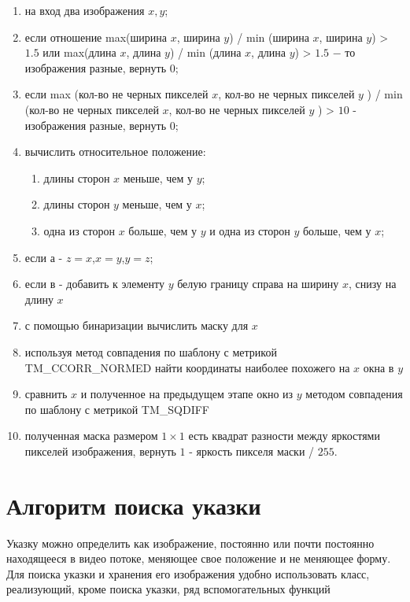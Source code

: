 \documentclass[oneside,final,14pt]{extreport}
\begin{document}
\begin{enumerate}%
\item на вход два изображения $x, y$;
\item если отношение max(ширина $x$, ширина $y$) / min (ширина $x$, ширина $y$) > $1.5$ или max(длина $x$, длина $y$) / min (длина $x$, длина $y$) > $1.5$ $-$ то изображения разные, вернуть $0$;
\item если  max (кол-во не черных пикселей $x$,  кол-во не черных пикселей $y$ ) / min (кол-во не черных пикселей $x$,  кол-во не черных пикселей $y$ ) > $10$ - изображения разные, вернуть $0$;
\item вычислить относительное положение: 

\begin{enumerate}%
\item длины сторон $x$ меньше, чем у $y$;
\item длины сторон $y$ меньше, чем у $x$;
\item одна из сторон $x$ больше, чем у $y$ и одна из сторон $y$ больше, чем у $x$;
\end{enumerate}

\item если а - $z = x$,$x = y$,$y = z$;
\item если в - добавить к элементу $y$ белую границу справа на ширину $x$, снизу на длину $x$
\item с помощью бинаризации вычислить маску для $x$
\item используя метод совпадения по шаблону с метрикой TM\_CCORR\_NORMED найти координаты наиболее похожего на $x$ окна в $y$
\item сравнить $x$ и полученное на предыдущем этапе окно из $y$ методом совпадения по шаблону с метрикой TM\_SQDIFF
\item полученная маска размером $1 \times 1$ есть квадрат разности между яркостями пикселей изображения, вернуть $1$ - яркость пикселя маски / $255$.
\end{enumerate}

\section{Алгоритм поиска указки}
Указку можно определить как изображение, постоянно или почти постоянно находящееся в видео потоке, меняющее свое положение и не меняющее форму. Для поиска указки и хранения его изображения удобно использовать класс, реализующий, кроме поиска указки, ряд вспомогательных функций
\end{document}
